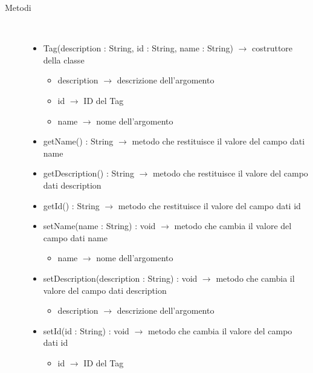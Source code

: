 \begin{description}
\item[Metodi] \hfill \\
\vspace{-7mm}
\begin{itemize}
	\item Tag(description : String, id : String, name : String) $\rightarrow$ costruttore della classe\begin{itemize}
		\item description $\rightarrow$ descrizione dell'argomento
		\item id $\rightarrow$ ID del Tag
		\item name $\rightarrow$ nome dell'argomento
	\end{itemize}
	
	\item getName() : String $\rightarrow$ metodo che restituisce il valore del campo dati name
	\item getDescription() : String $\rightarrow$ metodo che restituisce il valore del campo dati description
	\item getId() : String $\rightarrow$ metodo che restituisce il valore del campo dati id
	\item setName(name : String) : void $\rightarrow$ metodo che cambia il valore del campo dati name\begin{itemize}
		\item name $\rightarrow$ nome dell'argomento
	\end{itemize}
	
	\item setDescription(description : String) : void $\rightarrow$ metodo che cambia il valore del campo dati description\begin{itemize}
		\item description $\rightarrow$ descrizione dell'argomento
	\end{itemize}
	
	\item setId(id : String) : void $\rightarrow$ metodo che cambia il valore del campo dati id\begin{itemize}
		\item id $\rightarrow$ ID del Tag
	\end{itemize}
	
\end{itemize}

\end{description}

